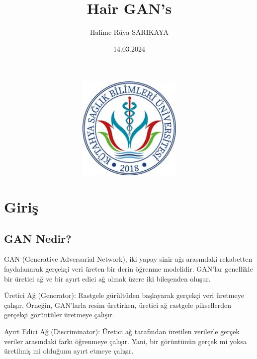 \documentclass[12pt]{article}
\begin{document}
\begin{figure}
    \centering
    \includegraphics[width=3\textwidth, height=5cm, keepaspectratio]{ksbu.png}
    \label{fig:enter-label}
\end{figure}

\title{Hair GAN's}
\author{Halime Rüya SARIKAYA}
\date{14.03.2024}

\maketitle
\newpage
\tableofcontents
\newpage

\section{Giriş}
\subsection{GAN Nedir?}
GAN (Generative Adversarial Network), iki yapay sinir ağı arasındaki rekabetten faydalanarak gerçekçi veri üreten bir derin öğrenme modelidir. GAN'lar genellikle bir üretici ağ ve bir ayırt edici ağ olmak üzere iki bileşenden oluşur.

Üretici Ağ (Generator): Rastgele gürültüden başlayarak gerçekçi veri üretmeye çalışır. Örneğin, GAN'larla resim üretirken, üretici ağ rastgele piksellerden gerçekçi görüntüler üretmeye çalışır.

Ayırt Edici Ağ (Discriminator): Üretici ağ tarafından üretilen verilerle gerçek veriler arasındaki farkı öğrenmeye çalışır. Yani, bir görüntünün gerçek mi yoksa üretilmiş mi olduğunu ayırt etmeye çalışır.\cite{mediumgan}
\end{document}
